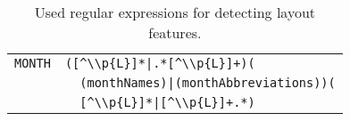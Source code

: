 \begin{table}[h!]
\begin{tabular}{l l}
   \texttt{MONTH}           &\verb$([^\\p{L}]*|.*[^\\p{L}]+)($\\
                            &\verb$  (monthNames)|(monthAbbreviations))($\\
                            &\verb$  [^\\p{L}]*|[^\\p{L}]+.*)$\\
  \bottomrule
\end{tabular}
\caption{Used regular expressions for detecting layout features.}
\label{tab:our-features-regular-expressions}
\end{table}

